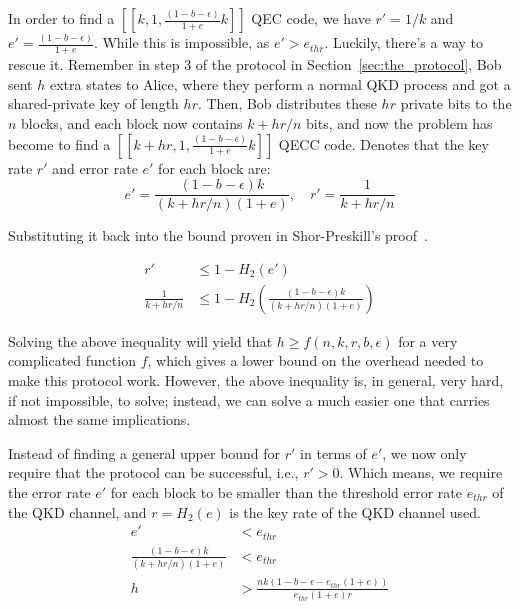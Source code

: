\documentclass[%
 reprint,
superscriptaddress,
 amsmath,amssymb,
 aps,
]{revtex4-2}
\begin{document}
In order to find a $[[k, 1,\frac{(1-b-\epsilon)}{1+e}k]]$ QEC code, we have $r'=1/k$ and $e'=\frac{(1-b-\epsilon)}{1+e}$. While this is impossible, as $e'>e_{thr}$. Luckily, there's a way to rescue it. Remember in step 3 of the protocol in Section~\ref{sec:the_protocol}, Bob sent $h$ extra states to Alice, where they perform a normal QKD process and got a shared-private key of length $hr$. Then, Bob distributes these $hr$ private bits to the $n$ blocks, and each block now contains $k+hr/n$ bits, and now the problem has become to find a $[[k+hr, 1, \frac{(1-b-\epsilon)}{1+e}k]]$ QECC code. Denotes that the key rate $r'$ and error rate $e'$ for each block are:
\begin{equation}
    e'=\frac{(1-b-\epsilon)k}{(k+hr/n)(1+e)}, \quad r'=\frac{1}{k+hr/n}
\end{equation}

Substituting it back into the bound proven in Shor-Preskill's proof~\cite{Shor_Preskill_Proof1}.

\begin{equation}
\begin{split}
    r'&\le1-H_2(e')\\
    \frac{1}{k+hr/n}&\le1-H_2\left(\frac{(1-b-\epsilon)k}{(k+hr/n)(1+e)}\right)
\end{split}
\end{equation}

Solving the above inequality will yield that $h\ge f(n, k, r, b,\epsilon)$ for a very complicated function $f$, which gives a lower bound on the overhead needed to make this protocol work. However, the above inequality is, in general, very hard, if not impossible, to solve; instead, we can solve a much easier one that carries almost the same implications.

Instead of finding a general upper bound for $r'$ in terms of $e'$, we now only require that the protocol can be successful, i.e., $r'>0$. Which means, we require the error rate $e'$ for each block to be smaller than the threshold error rate $e_{thr}$ of the QKD channel, and $r=H_2(e)$ is the key rate of the QKD channel used.
\begin{equation}
\begin{split}
    e'&< e_{thr}\\
    \frac{(1-b-\epsilon)k}{(k+hr/n)(1+e)}&< e_{thr}\\
    h&>\frac{nk(1-b-\epsilon-e_{thr}(1+e))}{e_{thr}(1+e)r}
\end{split}
\label{eq:lower_bound_h}
\end{equation}
\end{document}
